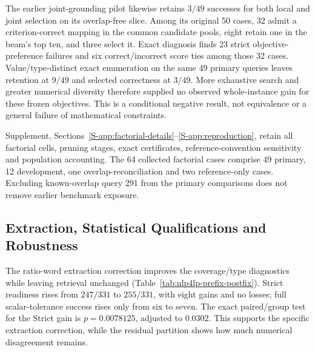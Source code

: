 \documentclass[pdflatex,sn-basic,Numbered]{sn-jnl}
\begin{document}
The earlier joint-grounding pilot likewise retains $3/49$ successes for both local and joint selection on its overlap-free slice. Among its original 50 cases, 32 admit a criterion-correct mapping in the common candidate pools, eight retain one in the beam's top ten, and three select it. Exact diagnosis finds 23 strict objective-preference failures and six correct/incorrect score ties among those 32 cases. Value/type-distinct exact enumeration on the same 49 primary queries leaves retention at $9/49$ and selected correctness at $3/49$. More exhaustive search and greater numerical diversity therefore supplied no observed whole-instance gain for these frozen objectives. This is a conditional negative result, not equivalence or a general failure of mathematical constraints.

Supplement, Sections~\ref{S-app:factorial-details}--\ref{S-app:reproduction}, retain all factorial cells, pruning stages, exact certificates, reference-convention sensitivity and population accounting. The 64 collected factorial cases comprise 49 primary, 12 development, one overlap-reconciliation and two reference-only cases. Excluding known-overlap query 291 from the primary comparisons does not remove earlier benchmark exposure.


\subsection{Extraction, Statistical Qualifications and Robustness}
\label{subsec:exp_significance}
The ratio-word extraction correction improves the coverage/type diagnostics while leaving retrieval unchanged (Table~\ref{tab:nlp4lp-prefix-postfix}). Strict readiness rises from $247/331$ to $255/331$, with eight gains and no losses; full scalar-tolerance success rises only from six to seven. The exact paired/group test for the Strict gain is $p=0.0078125$, adjusted to $0.0302$. This supports the specific extraction correction, while the residual partition shows how much numerical disagreement remains.
\end{document}
